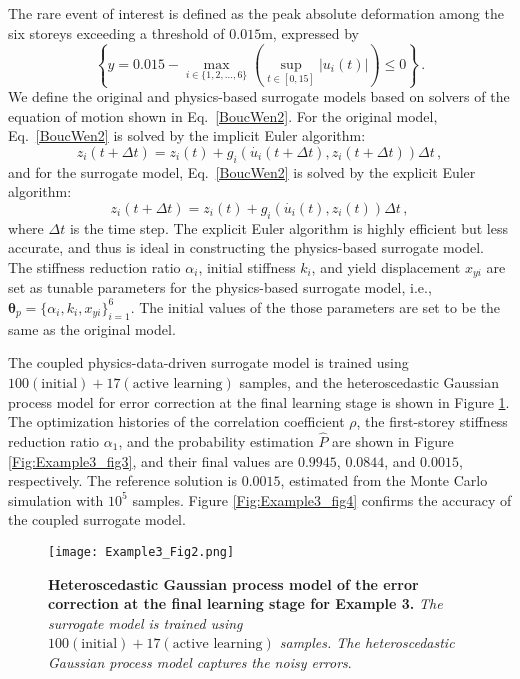 \documentclass[number,preprint,3p]{elsarticle}
\newcommand{\1}[2]{\mathbb{I}_{#1}\left(#2\right)}
\newcommand{\vect}[1]{\boldsymbol{#1}}
\begin{document}
 The rare event of interest is defined as the peak absolute deformation among the six storeys exceeding a threshold of $0.015$m, expressed by
\begin{equation}
 \left\lbrace y=0.015-\max_{i\in\{1,2,...,6\}}\left(\sup_{t\in[0,15]}|u_i(t)|\right)\leq0\right\rbrace\,.   
\end{equation} 
We define the original and physics-based surrogate models based on solvers of the equation of motion shown in Eq.~\eqref{BoucWen2}. For the original model, Eq.~\eqref{BoucWen2} is solved by the implicit Euler algorithm:
	\begin{equation}\label{ImplicitEuler}
		z_{i}(t+\Delta t)=z_{i}(t)+g_{i}(\dot{u_{i}}(t+\Delta t),z_{i}(t+\Delta t))\Delta t\,,
	\end{equation}
	and for the surrogate model, Eq.~\eqref{BoucWen2} is solved by the explicit Euler algorithm:
	\begin{equation}\label{ExplicitEuler}
		z_{i}(t+\Delta t)=z_{i}(t)+g_{i}(\dot{u_{i}}(t),z_{i}(t))\Delta t\,,
	\end{equation}
	where $\Delta t$ is the time step. The explicit Euler algorithm is highly efficient but less accurate, and thus is ideal in constructing the physics-based surrogate model. The stiffness reduction ratio $\alpha_{i}$, initial stiffness $k_{i}$, and yield displacement $x_{yi}$ are set as tunable parameters for the physics-based surrogate model, i.e., $\vect\theta_p=\{\alpha_{i},k_{i},x_{yi}\}^6_{i=1}$. The initial values of the those parameters are set to be the same as the original model. 
	
	The coupled physics-data-driven surrogate model is trained using $100(\text{initial})+17(\text{active learning})$ samples, and the heteroscedastic Gaussian process model for error correction at the final learning stage is shown in Figure \ref{Fig:Example3_fig2}. The optimization histories of the correlation coefficient ${\rho}$, the first-storey stiffness reduction ratio $\alpha_{1}$, and the probability estimation $\hat{P}$ are shown in Figure \ref{Fig:Example3_fig3}, and their final values are $0.9945$, $0.0844$, and $0.0015$, respectively. The reference solution is $0.0015$, estimated from the Monte Carlo simulation with $10^{5}$ samples. Figure \ref{Fig:Example3_fig4} confirms  the accuracy of the coupled surrogate model. 
	
	\begin{figure}[H]
		\centering
		\texttt{[image: Example3\_Fig2.png]}
		\caption{\textbf{Heteroscedastic Gaussian process model of the error correction at the final learning stage for Example 3.} \textit{The surrogate model is trained using $100(\text{initial})+17(\text{active learning})$ samples. The heteroscedastic Gaussian process model captures the noisy errors}.}
		\label{Fig:Example3_fig2}
	\end{figure}
	
\end{document}
